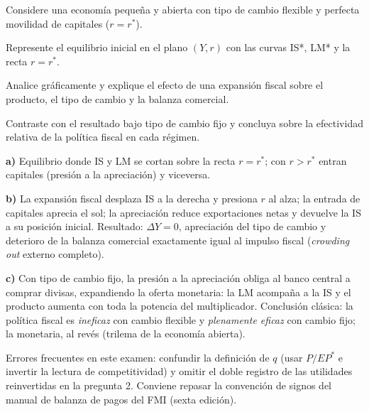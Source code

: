 \documentclass[soluciones]{evaluacion}
\begin{document}
\begin{pregunta}
Considere una economía pequeña y abierta con tipo de cambio flexible y
perfecta movilidad de capitales ($r = r^{*}$).
\begin{apartados}
  \item Represente el equilibrio inicial en el plano $(Y, r)$ con las
        curvas IS*, LM* y la recta $r = r^{*}$. 
  \item Analice gráficamente y explique el efecto de una expansión
        fiscal sobre el producto, el tipo de cambio y la balanza
        comercial. 
  \item Contraste con el resultado bajo tipo de cambio fijo y concluya
        sobre la efectividad relativa de la política fiscal en cada
        régimen. 
\end{apartados}
\begin{solucion}
\textbf{a)} Equilibrio donde IS y LM se cortan sobre la recta
$r = r^{*}$; con $r > r^{*}$ entran capitales (presión a la apreciación)
y viceversa.

\textbf{b)} La expansión fiscal desplaza IS a la derecha y presiona $r$
al alza; la entrada de capitales aprecia el sol; la apreciación reduce
exportaciones netas y devuelve la IS a su posición inicial. Resultado:
$\Delta Y = 0$, apreciación del tipo de cambio y deterioro de la balanza
comercial exactamente igual al impulso fiscal (\emph{crowding out}
externo completo).

\textbf{c)} Con tipo de cambio fijo, la presión a la apreciación obliga
al banco central a comprar divisas, expandiendo la oferta monetaria: la
LM acompaña a la IS y el producto aumenta con toda la potencia del
multiplicador. Conclusión clásica: la política fiscal es \emph{ineficaz}
con cambio flexible y \emph{plenamente eficaz} con cambio fijo; la
monetaria, al revés (trilema de la economía abierta).
\end{solucion}
\end{pregunta}

\begin{observacion}
Errores frecuentes en este examen: confundir la definición de $q$ (usar
$P/EP^{*}$ e invertir la lectura de competitividad) y omitir el doble
registro de las utilidades reinvertidas en la pregunta 2. Conviene
repasar la convención de signos del manual de balanza de pagos del FMI
(sexta edición).
\end{observacion}

\findelexamen
\end{document}
